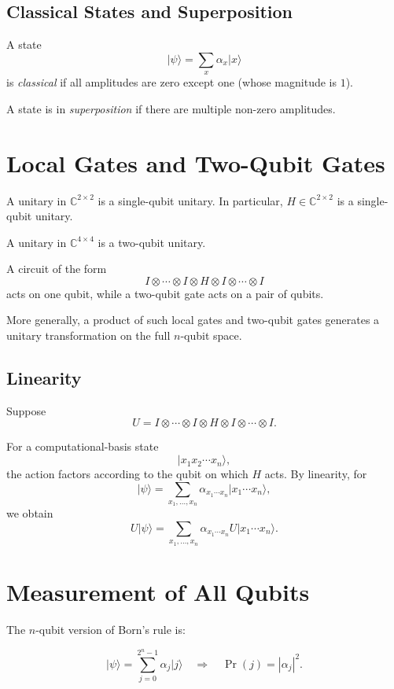 \documentclass[11pt]{article}
\newcommand{\ket}[1]{\lvert #1\rangle}
\newcommand{\Prob}{\operatorname{Pr}}
\newcommand{\C}{\mathbb{C}}
\begin{document}
\subsection{Classical States and Superposition}

A state
\[
  \ket{\psi}
  =
  \sum_x\alpha_x\ket{x}
\]
is \emph{classical} if all amplitudes are zero except one (whose magnitude
is $1$).

A state is in \emph{superposition} if there are multiple non-zero
amplitudes.

\section{Local Gates and Two-Qubit Gates}

A unitary in $\C^{2\times2}$ is a single-qubit unitary. In particular,
$H\in\C^{2\times2}$ is a single-qubit unitary.

A unitary in $\C^{4\times4}$ is a two-qubit unitary.

A circuit of the form
\[
  I\otimes\cdots\otimes I\otimes H\otimes I\otimes\cdots\otimes I
\]
acts on one qubit, while a two-qubit gate acts on a pair of qubits.

More generally, a product of such local gates and two-qubit gates generates
a unitary transformation on the full $n$-qubit space.

\subsection{Linearity}

Suppose
\[
  U
  =
  I\otimes\cdots\otimes I\otimes H\otimes I\otimes\cdots\otimes I.
\]

For a computational-basis state
\[
  \ket{x_1x_2\cdots x_n},
\]
the action factors according to the qubit on which $H$ acts. By linearity,
for
\[
  \ket{\psi}
  =
  \sum_{x_1,\ldots,x_n}
  \alpha_{x_1\cdots x_n}
  \ket{x_1\cdots x_n},
\]
we obtain
\[
  U\ket{\psi}
  =
  \sum_{x_1,\ldots,x_n}
  \alpha_{x_1\cdots x_n}
  U\ket{x_1\cdots x_n}.
\]

\section{Measurement of All Qubits}

The $n$-qubit version of Born's rule is:

\[
  \ket{\psi}
  =
  \sum_{j=0}^{2^n-1}\alpha_j\ket{j}
  \quad\Longrightarrow\quad
  \Prob(j)=|\alpha_j|^2.
\]
\end{document}
